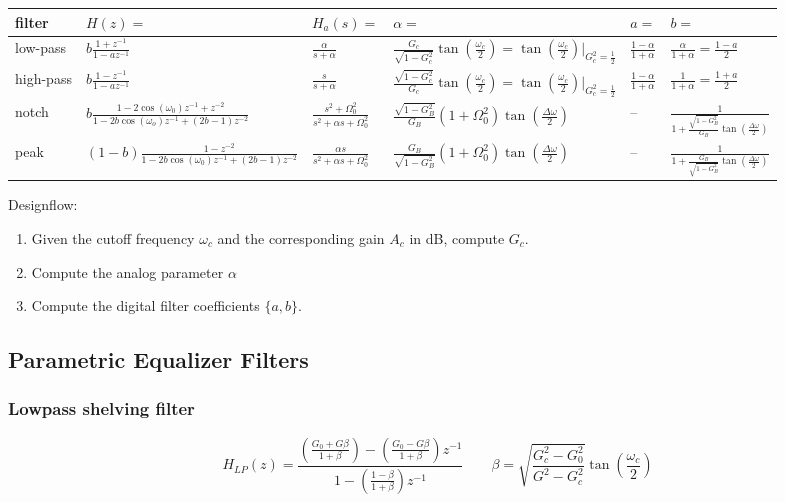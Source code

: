 \begin{tabularx}{\textwidth}{|X|l|l|l|l|l|}
	\hline
	\textbf{filter} & $H(z) = $ & $H_a(s) = $ & $\alpha = $ & $a=$ & $b=$
	\\ \hline
	low-pass	&
	$b\frac{1 + z^{-1}}{1 - a z^{-1}}$ &
	$\frac{\alpha}{s + \alpha}$	&
	$ \frac{G_c}{\sqrt{1-G_c^2}}\tan\left(\frac{\omega_c}{2}\right)
	= \tan\left(\frac{\omega_c}{2}\right)\vert_{G_c^2 = \frac{1}{2}}$&
	$\frac{1 - \alpha}{1 + \alpha}$ &
	$\frac{\alpha}{1 + \alpha} = \frac{1 - a}{2}$	
	\\ \hline
	high-pass &
	$b\frac{1 - z^{-1}}{1 - a z^{-1}}$ &
	$\frac{s}{s + \alpha}$ &
	$\frac{\sqrt{1-G_c^2}}{G_c}\tan\left(\frac{\omega_c}{2}\right)
	=\tan\left(\frac{\omega_c}{2}\right)\vert_{G_c^2 = \frac{1}{2}}$&
	$\frac{1-\alpha}{1+\alpha}$&
	$\frac{1}{1+\alpha} = \frac{1 + a}{2}$
	\\ \hline
	notch &
	$b\frac{1-2\cos(\omega_0) z^{-1} + z^{-2}}{1 -2b \cos(\omega_o) z^{-1} + (2b-1)z^{-2}}$&
	$\frac{s^2 + \Omega_0^2}{s^2+\alpha s + \Omega_0^2}$&
	$\frac{\sqrt{1-G_B^2}}{G_B}(1+\Omega_0^2)\tan\left(\frac{\Delta\omega}{2}\right)$&
	--&
	$\frac{1}{1+\frac{\sqrt{1-G_B^2}}{G_B}\tan\left(\frac{\Delta\omega}{2}\right)}$
	\\ \hline
	peak &
	$(1-b)\frac{1-z^{-2}}{1-2b\cos(\omega_0)z^{-1} + (2b-1)z^{-2}}$&
	$\frac{\alpha s}{s^2 + \alpha s + \Omega_0^2}$&
	$\frac{G_B}{\sqrt{1-G_B^2}}(1+\Omega_0^2)\tan\left(\frac{\Delta\omega}{2}\right)$&
	--&
	$\frac{1}{1+\frac{G_B}{\sqrt{1-G_B^2}}\tan\left(\frac{\Delta\omega}{2}\right)}$
	\\ \hline
\end{tabularx}
\vspace{1em}

Designflow:
\begin{enumerate}
	\item Given the cutoff frequency $\omega_c$ and the corresponding gain $A_c$ in dB, compute $G_c$.
	\item Compute the analog parameter $\alpha$
	\item Compute the digital filter coefficients $\{a,b\}$.
\end{enumerate}

\subsection{Parametric Equalizer Filters}
\subsubsection{Lowpass shelving filter}
\[
	H_{LP}(z) = 
	\frac{
		\left(\frac{G_0 + G\beta}{1+\beta}\right) - 
		\left(\frac{G_0-G\beta}{1+\beta}\right)z^{-1}
	}{
		1 -
		\left(\frac{1-\beta}{1+\beta}\right)z^{-1}
	}
	\qquad
	\beta =
		\sqrt{\frac{G_c^2-G_0^2}{G^2-G_c^2}}
		\tan\left(\frac{\omega_c}{2}\right)
\]

